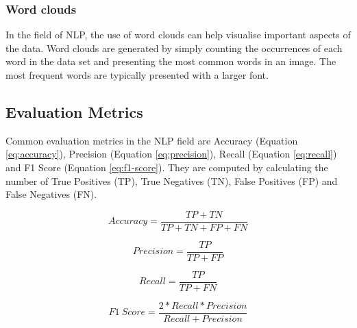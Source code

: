 \subsubsection{Word clouds}
In the field of NLP, the use of word clouds can help visualise important aspects of the data.
Word clouds are generated by simply counting the occurrences of each word in the data set and presenting the most common words in an image.
The most frequent words are typically presented with a larger font.

\subsection{Evaluation Metrics} \label{sec:evaluation-metrics}
Common evaluation metrics in the NLP field are Accuracy (Equation \ref{eq:accuracy}), Precision (Equation \ref{eq:precision}), Recall (Equation \ref{eq:recall}) and F1 Score (Equation \ref{eq:f1-score}).
They are computed by calculating the number of True Positives (TP), True Negatives (TN), False Positives (FP) and False Negatives (FN).

\begin{equation} \label{eq:accuracy}
    Accuracy = \frac{TP + TN}{TP + TN + FP + FN}
\end{equation}

\begin{equation} \label{eq:precision}
    Precision = \frac{TP}{TP + FP}
\end{equation}

\begin{equation} \label{eq:recall}
    Recall = \frac{TP}{TP + FN}
\end{equation}

\begin{equation} \label{eq:f1-score}
    F1\ Score = \frac{2 * Recall * Precision}{Recall + Precision}
\end{equation}

